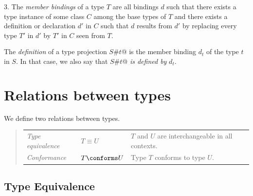 3. The {\em member bindings} of a type $T$ are all bindings $d$ such that
there exists a type instance of some class $C$ among the base types of $T$
and there exists a definition or declaration $d'$ in $C$
such that $d$ results from $d'$ by replacing every
type $T'$ in $d'$ by $T'$ in $C$ seen from $T$.

The {\em definition} of a type projection \lstinline@$S$#$t$@ is the member
binding $d_t$ of the type $t$ in $S$. In that case, we also say
that \lstinline@$S$#$t$@ {\em is defined by} $d_t$.

\section{Relations between types}

We define two relations between types.
\begin{quote}\begin{tabular}{l@{\gap}l@{\gap}l}
\em Type equivalence & $T \equiv U$ & $T$ and $U$ are interchangeable
in all contexts.
\\
\em Conformance & $T \conforms U$ & Type $T$ conforms to type $U$.
\end{tabular}\end{quote}

\subsection{Type Equivalence}
\label{sec:type-equiv}

